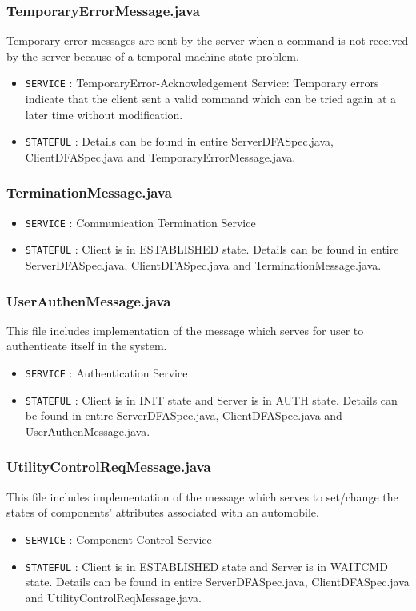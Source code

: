 \documentclass[12pt]{usenixsubmit}
\begin{document}
     \subsubsection{TemporaryErrorMessage.java}Temporary error messages are sent by the server when a command is not received by the server because of a temporal machine state problem.
     \begin{itemize}
     \item {\tt SERVICE} : TemporaryError-Acknowledgement Service: Temporary errors indicate that the client sent a valid command which can be tried again at a later time without modification.
     \item {\tt STATEFUL} : Details can be found in entire ServerDFASpec.java, ClientDFASpec.java and TemporaryErrorMessage.java.
     \end{itemize}

     \subsubsection{TerminationMessage.java}
     \begin{itemize}
     \item {\tt SERVICE} : Communication Termination Service
     \item {\tt STATEFUL} : Client is in ESTABLISHED state. Details can be found in entire ServerDFASpec.java, ClientDFASpec.java and TerminationMessage.java.
     \end{itemize}

     \subsubsection{UserAuthenMessage.java}This file includes implementation of the message which serves for user to authenticate itself in the system.
     \begin{itemize}
     \item {\tt SERVICE} : Authentication Service
     \item {\tt STATEFUL} : Client is in INIT state and Server is in AUTH state. Details can be found in entire ServerDFASpec.java, ClientDFASpec.java and UserAuthenMessage.java.
     \end{itemize}

    \subsubsection{UtilityControlReqMessage.java}This file includes implementation of the message which serves to set/change the states of components' attributes associated with an automobile.
     \begin{itemize}
     \item {\tt SERVICE} : Component Control Service
     \item {\tt STATEFUL} : Client is in ESTABLISHED state and Server is in WAITCMD state.  Details can be found in entire ServerDFASpec.java, ClientDFASpec.java and UtilityControlReqMessage.java.
     \end{itemize}
\end{document}
